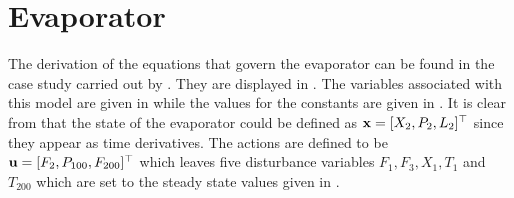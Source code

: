 %
%
%


\section{Evaporator} \label{app:evaporator}
The derivation of the equations that govern the evaporator can be found in the case study carried out by \cite{NeLe89}. They are displayed in . The variables associated with this model are given in  while the values for the constants are given in . It is clear from  that the state of the evaporator could be defined as $\mathbf{x} = [X_2, P_2, L_2]^\top$ since they appear as time derivatives. The actions are defined to be $\mathbf{u} = [F_2, P_{100}, F_{200}]^\top$ which leaves five disturbance variables $F_1, F_3, X_1, T_1$ and $T_{200}$ which are set to the steady state values given in .


